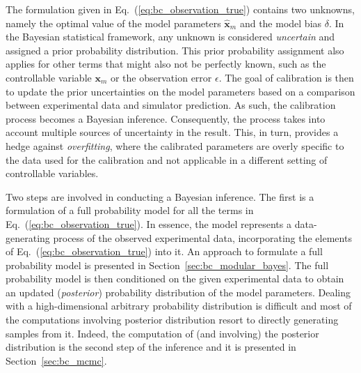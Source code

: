 The formulation given in Eq.~(\ref{eq:bc_observation_true}) contains two unknowns, namely the optimal value of the model parameters $\hat{\bm{x}}_m$ and the model bias $\delta$.
In the Bayesian statistical framework, any unknown is considered \emph{uncertain} and assigned a prior probability distribution.
This prior probability assignment also applies for other terms that might also not be perfectly known, such as the controllable variable $\bm{x}_m$ or the observation error $\epsilon$. 
The goal of calibration is then to update the prior uncertainties on the model parameters based on a comparison between experimental data and simulator prediction.
As such, the calibration process becomes a Bayesian inference.
Consequently, the process takes into account multiple sources of uncertainty in the result. 
This, in turn, provides a hedge against \emph{overfitting}, where the calibrated parameters are overly specific to the data used for the calibration and not applicable in a different setting of controllable variables.

Two steps are involved in conducting a Bayesian inference.
The first is a formulation of a full probability model for all the terms in Eq.~(\ref{eq:bc_observation_true}).
In essence, the model represents a data-generating process of the observed experimental data,
incorporating the elements of Eq.~(\ref{eq:bc_observation_true}) into it.
An approach to formulate a full probability model is presented in Section~\ref{sec:bc_modular_bayes}.
The full probability model is then conditioned on the given experimental data to obtain an updated (\emph{posterior}) probability distribution of the model parameters.
Dealing with a high-dimensional arbitrary probability distribution is difficult and most of the computations involving  posterior distribution resort to directly generating samples from it. 
Indeed, the computation of (and involving) the posterior distribution is the second step of the inference and it is presented in Section~\ref{sec:bc_mcmc}.
